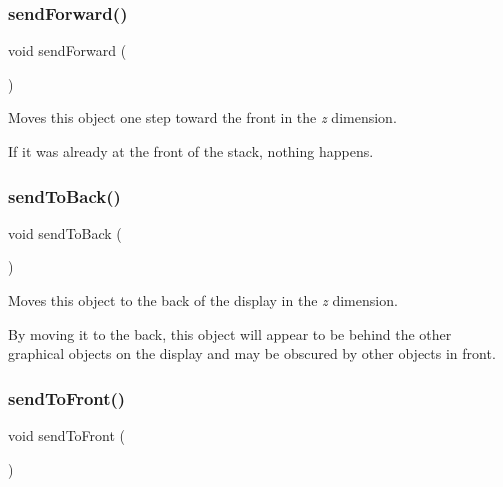 \subsubsection{\texorpdfstring{send\+Forward()}{sendForward()}}
{\footnotesize\ttfamily void send\+Forward (\begin{DoxyParamCaption}{ }\end{DoxyParamCaption})\hspace{0.3cm}{\ttfamily [inherited]}}



Moves this object one step toward the front in the {\itshape z} dimension. 

If it was already at the front of the stack, nothing happens. \mbox{\label{classGObject_a0f7f1efbb7fd46dde2867c4ad0330896}} 
\subsubsection{\texorpdfstring{send\+To\+Back()}{sendToBack()}}
{\footnotesize\ttfamily void send\+To\+Back (\begin{DoxyParamCaption}{ }\end{DoxyParamCaption})\hspace{0.3cm}{\ttfamily [inherited]}}



Moves this object to the back of the display in the {\itshape z} dimension. 

By moving it to the back, this object will appear to be behind the other graphical objects on the display and may be obscured by other objects in front. \mbox{\label{classGObject_aee33d68488e46827ef55fac07f40a9b2}} 
\subsubsection{\texorpdfstring{send\+To\+Front()}{sendToFront()}}
{\footnotesize\ttfamily void send\+To\+Front (\begin{DoxyParamCaption}{ }\end{DoxyParamCaption})\hspace{0.3cm}{\ttfamily [inherited]}}



